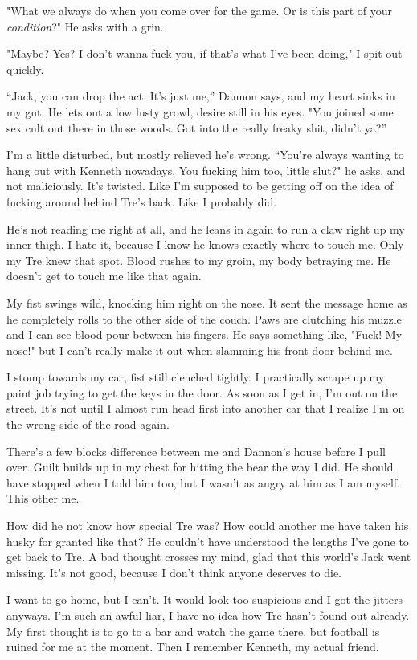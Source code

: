 "What we always do when you come over for the game. Or is this part of your \emph{condition}?" He asks with a grin.

"Maybe? Yes? I don't wanna fuck you, if that's what I've been doing," I spit out quickly.

``Jack, you can drop the act. It's just me,'' Dannon says, and my heart sinks in my gut. He lets out a low lusty growl, desire still in his eyes. "You joined some sex cult out there in those woods. Got into the really freaky shit, didn't ya?''

I'm a little disturbed, but mostly relieved he's wrong. ``You're always wanting to hang out with Kenneth nowadays. You fucking him too, little slut?" he asks, and not maliciously. It's twisted. Like I'm supposed to be getting off on the idea of fucking around behind Tre's back. Like I probably did.

He's not reading me right at all, and he leans in again to run a claw right up my inner thigh. I hate it, because I know he knows exactly where to touch me. Only my Tre knew that spot. Blood rushes to my groin, my body betraying me. He doesn't get to touch me like that again.

My fist swings wild, knocking him right on the nose. It sent the message home as he completely rolls to the other side of the couch. Paws are clutching his muzzle and I can see blood pour between his fingers. He says something like, "Fuck! My nose!" but I can't really make it out when slamming his front door behind me.

I stomp towards my car, fist still clenched tightly. I practically scrape up my paint job trying to get the keys in the door. As soon as I get in, I'm out on the street. It's not until I almost run head first into another car that I realize I'm on the wrong side of the road again.

There's a few blocks difference between me and Dannon's house before I pull over. Guilt builds up in my chest for hitting the bear the way I did. He should have stopped when I told him too, but I wasn't as angry at him as I am myself. This other me.

How did he not know how special Tre was? How could another me have taken his husky for granted like that? He couldn't have understood the lengths I've gone to get back to Tre. A bad thought crosses my mind, glad that this world's Jack went missing. It's not good, because I don't think anyone deserves to die.

I want to go home, but I can't. It would look too suspicious and I got the jitters anyways. I'm such an awful liar, I have no idea how Tre hasn't found out already. My first thought is to go to a bar and watch the game there, but football is ruined for me at the moment. Then I remember Kenneth, my actual friend.

